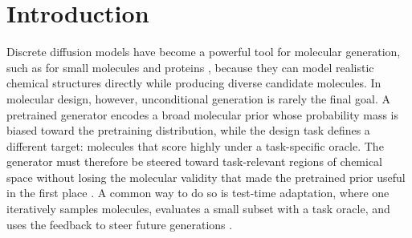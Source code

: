 \section{Introduction}







Discrete diffusion models have become a powerful tool for molecular generation, such as for small molecules \citep{leeGenMolDrugDiscovery2025, schiffSimpleGuidanceMechanisms2025} and proteins \citep{wangDiffusionLanguageModels2024}, because they can model realistic chemical structures directly while producing diverse candidate molecules. 
In molecular design, however, unconditional generation is rarely the final goal. 
A pretrained generator encodes a broad molecular prior whose probability mass is biased toward the pretraining distribution, while the design task defines a different target: molecules that score highly under a task-specific oracle. The generator must therefore be steered toward task-relevant regions of chemical space without losing the molecular validity that made the pretrained prior useful in the first place \citep{HowArtificialIntelligence,  ueharaInferenceTimeAlignmentDiffusion2025}.
A common way to do so is test-time adaptation, where one iteratively samples molecules, evaluates a small subset with a task oracle, and uses the feedback to steer future generations \citep{yangSteeringGenerativeModels2025, stoccoGuidingGenerativeModels2025}.





